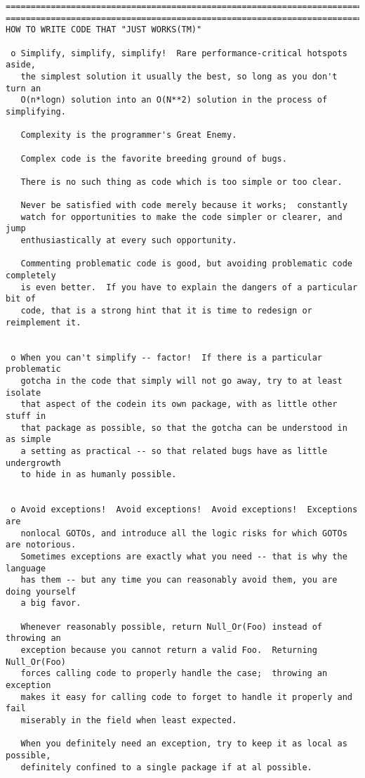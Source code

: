 \begin{verbatim}
====================================================================================
====================================================================================
HOW TO WRITE CODE THAT "JUST WORKS(TM)"

 o Simplify, simplify, simplify!  Rare performance-critical hotspots aside,
   the simplest solution it usually the best, so long as you don't turn an
   O(n*logn) solution into an O(N**2) solution in the process of simplifying.

   Complexity is the programmer's Great Enemy.

   Complex code is the favorite breeding ground of bugs.

   There is no such thing as code which is too simple or too clear.

   Never be satisfied with code merely because it works;  constantly
   watch for opportunities to make the code simpler or clearer, and jump
   enthusiastically at every such opportunity.

   Commenting problematic code is good, but avoiding problematic code completely
   is even better.  If you have to explain the dangers of a particular bit of
   code, that is a strong hint that it is time to redesign or reimplement it.


 o When you can't simplify -- factor!  If there is a particular problematic
   gotcha in the code that simply will not go away, try to at least isolate
   that aspect of the codein its own package, with as little other stuff in
   that package as possible, so that the gotcha can be understood in as simple
   a setting as practical -- so that related bugs have as little undergrowth
   to hide in as humanly possible.


 o Avoid exceptions!  Avoid exceptions!  Avoid exceptions!  Exceptions are
   nonlocal GOTOs, and introduce all the logic risks for which GOTOs are notorious.
   Sometimes exceptions are exactly what you need -- that is why the language
   has them -- but any time you can reasonably avoid them, you are doing yourself
   a big favor.

   Whenever reasonably possible, return Null_Or(Foo) instead of throwing an
   exception because you cannot return a valid Foo.  Returning Null_Or(Foo)
   forces calling code to properly handle the case;  throwing an exception
   makes it easy for calling code to forget to handle it properly and fail
   miserably in the field when least expected.

   When you definitely need an exception, try to keep it as local as possible,
   definitely confined to a single package if at al possible.



\end{verbatim}
